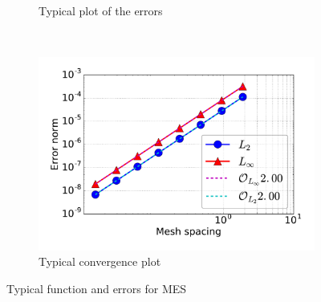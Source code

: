\begin{figure}[t!]
\begin{subfigure}[t]{0.45\textwidth}
        \caption{Typical plot of the errors}
    \end{subfigure}
    ~
    \begin{subfigure}[t]{0.45\textwidth}
        \centering
        \includegraphics[width=1.0\textwidth]{fig/conv}
        \caption{Typical convergence plot}
    \end{subfigure}
    \caption{Typical function and errors for MES}
\end{figure}


